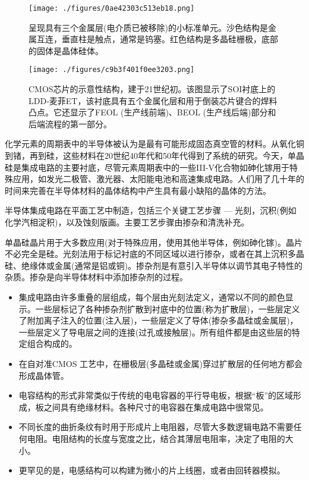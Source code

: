 \begin{figure}[ht]
\centering
\texttt{[image: ./figures/0ae42303c513eb18.png]}
\caption{呈现具有三个金属层(电介质已被移除)的小标准单元。沙色结构是金属互连，垂直柱是触点，通常是钨塞。红色结构是多晶硅栅极，底部的固体是晶体硅体。} \label{fig_icJCDL_5}
\end{figure}

\begin{figure}[ht]
\centering
\texttt{[image: ./figures/c9b3f401f0ee3203.png]}
\caption{CMOS芯片的示意性结构，建于21世纪初。该图显示了SOI衬底上的LDD-麦菲ET，该衬底具有五个金属化层和用于倒装芯片键合的焊料凸点。它还显示了FEOL (生产线前端)、BEOL (生产线后端)部分和后端流程的第一部分。} \label{fig_icJCDL_6}
\end{figure}

化学元素的周期表中的半导体被认为是最有可能形成固态真空管的材料。从氧化铜到锗，再到硅，这些材料在20世纪40年代和50年代得到了系统的研究。今天，单晶硅是集成电路的主要衬底，尽管元素周期表中的一些III-V化合物如砷化镓用于特殊应用，如发光二极管、激光器、太阳能电池和高速集成电路。人们用了几十年的时间来完善在半导体材料的晶体结构中产生具有最小缺陷的晶体的方法。

半导体集成电路在平面工艺中制造，包括三个关键工艺步骤 — 光刻，沉积(例如化学汽相淀积)，以及蚀刻版画。主要工艺步骤由掺杂和清洗补充。

单晶硅晶片用于大多数应用(对于特殊应用，使用其他半导体，例如砷化镓)。晶片不必完全是硅。光刻法用于标记衬底的不同区域以进行掺杂，或者在其上沉积多晶硅、绝缘体或金属(通常是铝或铜)。掺杂剂是有意引入半导体以调节其电子特性的杂质。掺杂是向半导体材料中添加掺杂剂的过程。

\begin{itemize}
\item 集成电路由许多重叠的层组成，每个层由光刻法定义，通常以不同的颜色显示。一些层标记了各种掺杂剂扩散到衬底中的位置(称为扩散层)，一些层定义了附加离子注入的位置(注入层)，一些层定义了导体(掺杂多晶硅或金属层)，一些层定义了导电层之间的连接(过孔或接触层)。所有组件都是由这些层的特定组合构成的。
\item 在自对准CMOS 工艺中，在栅极层(多晶硅或金属)穿过扩散层的任何地方都会形成晶体管。
\item 电容结构的形式非常类似于传统的电电容器的平行导电板，根据“板”的区域形成，板之间具有绝缘材料。各种尺寸的电容器在集成电路中很常见。
\item 不同长度的曲折条纹有时用于形成片上电阻器，尽管大多数逻辑电路不需要任何电阻。电阻结构的长度与宽度之比，结合其薄层电阻率，决定了电阻的大小。
\item 更罕见的是，电感结构可以构建为微小的片上线圈，或者由回转器模拟。
\end{itemize}

